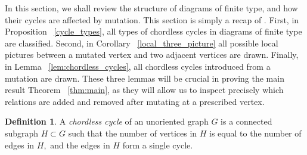 \documentclass[11pt]{amsart}
\theoremstyle{definition}
\newtheorem{defn}[thm]{Definition}
\begin{document}
In this section, we shall review the structure of diagrams of finite type, and how their cycles are affected by mutation. This section is simply a recap of \cite[Section 2]{BM13}. First, in Proposition ~\ref{cycle_types}, all types of chordless cycles in diagrams of finite type are classified. Second, in Corollary ~\ref{local_three_picture} all possible local pictures between a mutated vertex and two adjacent vertices are drawn. Finally, in Lemma ~\ref{lem:chordless_cycles}, all chordless cycles introduced from a mutation are drawn. These three lemmas will be crucial in proving the main result Theorem ~\ref{thm:main}, as they will allow us to inspect precisely which relations are added and removed after mutating at a prescribed vertex.

\begin{defn}
\label{chordlesscycle}
A {\it chordless cycle} of an unoriented graph $G$ is a connected subgraph $H \subset G$ such that the number of vertices in $H$ is equal to the number of edges in $H,$ and the edges in $H$ form a single cycle.
\end{defn}
\end{document}
